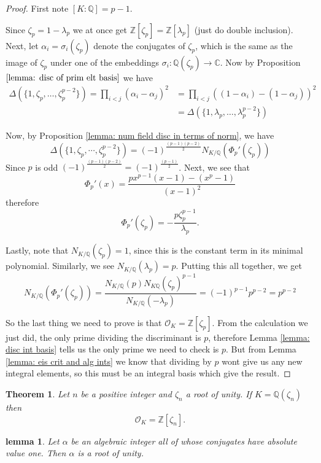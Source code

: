 \documentclass[11pt,a4paper]{amsart}
\theoremstyle{plain}
\newtheorem{theorem}[subsection]{Theorem}
\newtheorem{lemma}[subsection]{lemma}
\theoremstyle{definition}
\theoremstyle{definition}
\newcommand{\ZZ}{\mathbb{Z}}
\def\CC{\mathbb{C}}
\def\QQ{\mathbb{Q}}
\def \a{\alpha}
\def \lam {\lambda}
\def \OO {\mathcal{O}}
\begin{document}
	\begin{proof}
		First note $[K:\QQ]=p-1$.
		
		Since $\zeta_p=1-\lam_p$ we at once get $\ZZ[\zeta_p]=\ZZ[\lam_p]$ (just do double inclusion). Next, let $\a_i=\sigma_i(\zeta_p)$ denote the conjugates of $\zeta_p$, which is the same as the image of $\zeta_p$ under one of the embeddings $\sigma_i: \QQ(\zeta_p) \to \CC$. Now  by Proposition $\ref{lemma: disc of prim elt basis}$ we have \begin{align*}\Delta(\{1,\zeta_p,\dots,\zeta_p^{p-2}\})=\prod_{i < j}  (\a_i-\a_j)^2 &=\prod_{i < j}  ((1-\a_i)-(1-\a_j))^2\\&=\Delta(\{1,\lam_p,\dots,\lam_p^{p-2}\})\end{align*}
		
		Now, by Proposition \ref{lemma: num field disc in terms of norm}, we have \[\Delta(\{1,\zeta_p,\cdots,\zeta_p^{p-2}\})=(-1)^{\frac{(p-1)(p-2)}{2}}N_{K/\QQ}(\Phi_p'(\zeta_p)  )\]
		Since $p$ is odd $(-1)^{\frac{(p-1)(p-2)}{2}}=(-1)^{\frac{(p-1)}{2}}$. Next, we see that \[\Phi_p'(x)=\frac{px^{p-1}(x-1)-(x^p-1)}{(x-1)^2}\] therefore \[\Phi_p'(\zeta_p)=-\frac{p\zeta_p^{p-1}}{\lam_p}.\]
		
		Lastly, note that $N_{K/\QQ}(\zeta_p)=1$, since this is the constant term in its minimal polynomial. Similarly, we see $N_{K/\QQ}(\lam_p)=p$. Putting this all together, we get \[N_{K/\QQ}(\Phi_p'(\zeta_p)  )=\frac{N_{K/\QQ}(p)N_{K\QQ}(\zeta_p)^{p-1}}{N_{K/\QQ}(-\lam_p)}=(-1)^{p-1}p^{p-2}=p^{p-2}\]
		
		So the last thing we need to prove is that $\OO_K=\ZZ[\zeta_p]$. From the calculation we just did, the only prime dividing the discriminant is $p$, therefore Lemma \ref{lemma: disc int basis} tells us the only prime we need to check is $p$. But from Lemma \ref{lemma: eis crit and alg ints} we know that dividing by $p$ wont give us any new integral elements, so this must be an integral basis which give the result.
		
		
		
	\end{proof}
	
	
	\begin{theorem}\label{theorem: ring of ints of cyclo field}
		Let $n$ be a positive integer and $\zeta_n$ a root of unity. If $K=\QQ(\zeta_n)$ then \[\OO_K=\ZZ[\zeta_n].\]
	\end{theorem}
	
	
	\begin{lemma}\label{lemma: alg_int_abs_val_one}
		Let $\a$ be an algebraic integer all of whose conjugates have absolute value one. Then $\a$ is a root of unity.
	\end{lemma}
	
\end{document}
